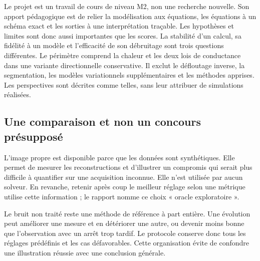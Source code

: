 Le projet est un travail de cours de niveau M2, non une recherche
nouvelle. Son apport pédagogique est de relier la modélisation aux
équations, les équations à un schéma exact et les sorties à une
interprétation traçable. Les hypothèses et limites sont donc aussi
importantes que les scores. La stabilité d'un calcul, sa fidélité à un
modèle et l'efficacité de son débruitage sont trois questions différentes.
Le périmètre comprend la chaleur et les deux lois de conductance dans
une variante directionnelle conservative. Il exclut le défloutage
inverse, la segmentation, les modèles variationnels supplémentaires et
les méthodes apprises. Les perspectives sont décrites comme telles,
sans leur attribuer de simulations réalisées.

\subsection{Une comparaison et non un concours présupposé}
L'image propre est disponible parce que les données sont synthétiques.
Elle permet de mesurer les reconstructions et d'illustrer un compromis
qui serait plus difficile à quantifier sur une acquisition inconnue.
Elle n'est utilisée par aucun solveur. En revanche, retenir après coup
le meilleur réglage selon une métrique utilise cette information ; le
rapport nomme ce choix « oracle exploratoire ».

Le bruit non traité reste une méthode de référence à part entière.
Une évolution peut améliorer une mesure et en détériorer une autre,
ou devenir moins bonne que l'observation avec un arrêt trop tardif.
Le protocole conserve donc tous les réglages prédéfinis et les cas
défavorables. Cette organisation évite de confondre une illustration
réussie avec une conclusion générale.
